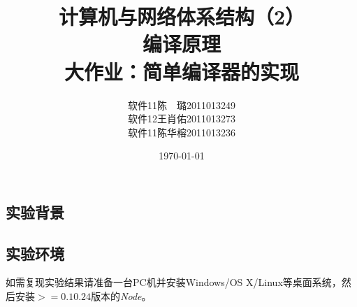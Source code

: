 \documentclass[a4paper]{article}
\begin{document}
\begin{CJK*}{UTF8}{gbsn}
    \CJKindent
    \setlength{\parindent}{2em} %
 
    \pagestyle{fancy}
  
    \title{\huge{计算机与网络体系结构（2）}\\\Large{编译原理}\\{\large 大作业：简单编译器的实现}}
    \author{
    软件11\hspace{10pt}陈　璐\hspace{10pt}2011013249\\
    软件12\hspace{10pt}王肖佑\hspace{10pt}2011013273\\
    软件11\hspace{10pt}陈华榕\hspace{10pt}2011013236
    }
    \date{\today}
    \maketitle
    \tableofcontents    
    \newpage

    \section{实验背景}
    \subsection{实验环境}
    如需复现实验结果请准备一台PC机并安装Windows/OS X/Linux等桌面系统，然后安装$>=0.10.24$版本的\textit{Node}。


\end{CJK*}
\end{document}
